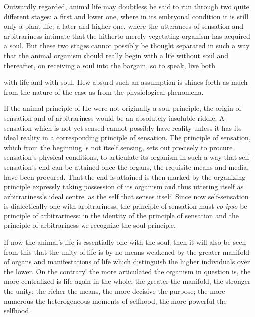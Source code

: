 \documentclass[12pt,a4paper]{book}
\begin{document}
Outwardly regarded, animal life may doubtless be said to run through two quite
different stages: a first and lower one, where in its embryonal condition it is
still only a plant life; a later and higher one, where the utterances of sensation
and arbitrariness intimate that the hitherto merely vegetating organism has
acquired a soul. But these two stages cannot possibly be thought separated in such
a way that the animal organism should really begin with a life without soul and
thereafter, on receiving a soul into the bargain, so to speak, live both

with life and with soul. How absurd such an assumption is shines forth as much from
the nature of the case as from the physiological phenomena.

If the animal principle of life were not originally a soul-principle, the origin of
sensation and of arbitrariness would be an absolutely insoluble riddle. A sensation
which is not yet sensed cannot possibly have reality unless it has its ideal
reality in a corresponding principle of sensation. The principle of sensation,
which from the beginning is not itself sensing, sets out precisely to procure
sensation's physical conditions, to articulate its organism in such a way that
self-sensation's end can be attained once the organs, the requisite means and
media, have been procured. That the end is attained is then marked by the
organizing principle expressly taking possession of its organism and thus uttering
itself as arbitrariness's ideal centre, as the self that senses itself. Since now
self-sensation is dialectically one with arbitrariness, the principle of sensation
must \textit{eo ipso} be principle of arbitrariness: in the identity of the
principle of sensation and the principle of arbitrariness we recognize the
soul-principle.

If now the animal's life is essentially one with the soul, then it will also be
seen from this that the unity of life is by no means weakened by the greater
manifold of organs and manifestations of life which distinguish the higher
individuals over the lower. On the contrary! the more articulated the organism in
question is, the more centralized is life again in the whole: the greater the
manifold, the stronger the unity; the richer the means, the more decisive the
purpose; the more numerous the heterogeneous moments of selfhood, the more powerful
the selfhood.
\end{document}
